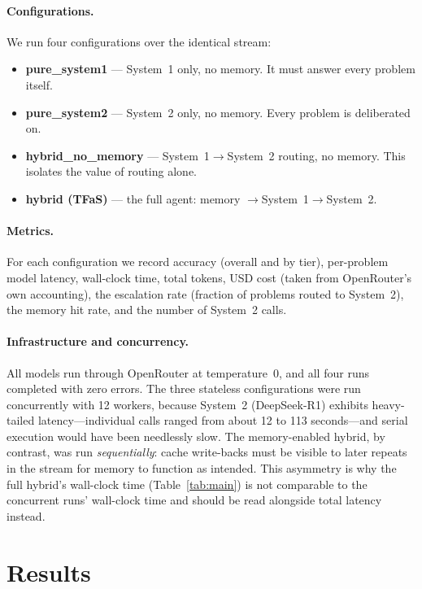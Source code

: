\documentclass[11pt]{article}
\newcommand{\sysone}{System~1}
\newcommand{\systwo}{System~2}
\begin{document}
\paragraph{Configurations.} We run four configurations over the identical stream:
\begin{itemize}
  \item \textbf{pure\_system1} --- \sysone{} only, no memory. It must answer
        every problem itself.
  \item \textbf{pure\_system2} --- \systwo{} only, no memory. Every problem is
        deliberated on.
  \item \textbf{hybrid\_no\_memory} --- \sysone{}$\rightarrow$\systwo{} routing,
        no memory. This isolates the value of routing alone.
  \item \textbf{hybrid (TFaS)} --- the full agent: memory
        $\rightarrow$\sysone{}$\rightarrow$\systwo.
\end{itemize}

\paragraph{Metrics.} For each configuration we record accuracy (overall and by
tier), per-problem model latency, wall-clock time, total tokens, USD cost (taken
from OpenRouter's own accounting), the escalation rate (fraction of problems
routed to \systwo), the memory hit rate, and the number of \systwo{} calls.

\paragraph{Infrastructure and concurrency.} All models run through OpenRouter at
temperature~0, and all four runs completed with zero errors. The three stateless
configurations were run concurrently with 12 workers, because \systwo{}
(DeepSeek-R1) exhibits heavy-tailed latency---individual calls ranged from about
12 to 113 seconds---and serial execution would have been needlessly slow. The
memory-enabled hybrid, by contrast, was run \emph{sequentially}: cache
write-backs must be visible to later repeats in the stream for memory to function
as intended. This asymmetry is why the full hybrid's wall-clock time
(Table~\ref{tab:main}) is not comparable to the concurrent runs' wall-clock time
and should be read alongside total latency instead.

\section{Results}
\label{sec:results}
\end{document}
